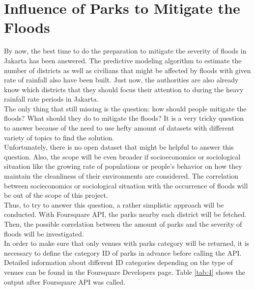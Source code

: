 \chapter{Influence of Parks to Mitigate the Floods}

By now,  the best time to do the preparation to mitigate the severity of floods in Jakarta has been answered. The predictive modeling algorithm to estimate the number of districts as well as civilians that might be affected by floods with given rate of rainfall also have been built. Just now, the authorities are also already know which districts that they should focus their attention to during the heavy rainfall rate periods in Jakarta.\\

\noindent
The only thing that still missing is the question: how should people mitigate the floods? What should they do to mitigate the floods? It is a very tricky question to answer because of the need to use hefty amount of datasets with different variety of topics to find the solution.\\
 
\noindent
Unfortunately, there is no open dataset that might be helpful to answer this question. Also, the scope will be even broader if socioeconomics or sociological situation like the growing rate of populations or people's behavior on how they maintain the cleanliness of their environments are considered. The correlation between socieconomics or sociological situation with the occurrence of floods will be out of the scope of this project.\\

\noindent
Thus, to try to answer this question, a rather simplistic approach will be conducted. With Foursquare API, the parks nearby each district will be fetched. Then, the possible correlation between the amount of parks and the severity of floods will be investigated.\\

\noindent
In order to make sure that only venues with parks category will be returned, it is necessary to define the category ID of parks in advance before calling the API. Detailed information about different ID categories depending on the type of venues can be found in the Foursquare Developers page. Table \ref{tab:4} shows the output after Foursquare API was called.\\

